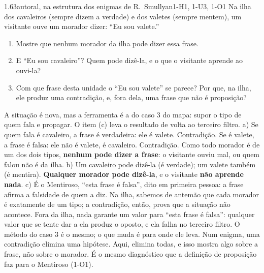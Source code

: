 \begin{exemplo}{1.6}{3}{autoral, na estrutura dos enigmas de R.~Smullyan}{1-H1, 1-U3, 1-O1}\label{ex:1.6}
Na ilha dos cavaleiros (sempre dizem a verdade) e dos valetes (sempre mentem), um visitante ouve um morador dizer: \enquote{Eu sou valete.}
\begin{enumerate}[label=\alph*)]
  \item Mostre que nenhum morador da ilha pode dizer essa frase.
  \item E \enquote{Eu sou cavaleiro}? Quem pode dizê-la, e o que o visitante aprende ao ouvi-la?
  \item Com que frase desta unidade o \enquote{Eu sou valete} se parece? Por que, na ilha, ele produz uma contradição, e, fora dela, uma frase que não é proposição?
\end{enumerate}
\plano A situação é nova, mas a ferramenta é a do caso 3 do mapa: supor o tipo de quem fala e propagar. O item (c) leva o resultado de volta ao terceiro filtro.
\resolucao
a) Se quem fala é cavaleiro, a frase é verdadeira: ele é valete. Contradição. Se é valete, a frase é falsa: ele não é valete, é cavaleiro. Contradição. Como todo morador é de um dos dois tipos, \textbf{nenhum pode dizer a frase}: o visitante ouviu mal, ou quem falou não é da ilha.
b) Um cavaleiro pode dizê-la (é verdade); um valete também (é mentira). \textbf{Qualquer morador pode dizê-la}, e o visitante \textbf{não aprende nada}.
c) É o Mentiroso, \enquote{esta frase é falsa}, dito em primeira pessoa: a frase afirma a falsidade de quem a diz. Na ilha, sabemos de antemão que cada morador é exatamente de um tipo; a contradição, então, prova que a situação não acontece. Fora da ilha, nada garante um valor para \enquote{esta frase é falsa}: qualquer valor que se tente dar a ela produz o oposto, e ela falha no terceiro filtro.
\comentario O método do caso 3 é o mesmo; o que muda é para onde ele leva. Num enigma, uma contradição elimina uma hipótese. Aqui, elimina todas, e isso mostra algo sobre a frase, não sobre o morador. É o mesmo diagnóstico que a definição de proposição faz para o Mentiroso (1-O1).
\end{exemplo}


\Questoes

